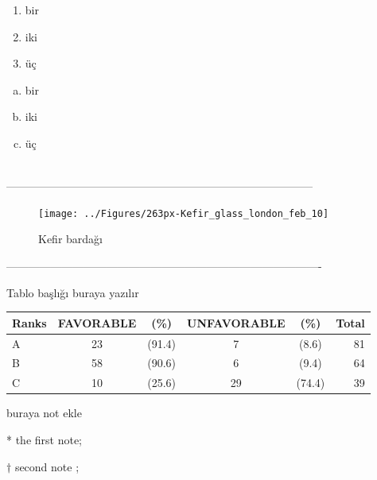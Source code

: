 \begin{minipage}{0.45\textwidth}
	\begin{enumerate}[1.]\itemsep-6pt%
		\item bir
		\item iki
		\item üç
	\end{enumerate}
\end{minipage}
\hfill
\begin{minipage}{0.45\textwidth}
	\begin{enumerate}[a.]\itemsep-6pt
		\item bir
		\item iki
		\item üç
	\end{enumerate}
\end{minipage}\\[3cm]
-----------------------------------------------------------------------------------
\newpage
\begin{figure}[tbph]
\centering
\texttt{[image: ../Figures/263px-Kefir\_glass\_london\_feb\_10]}
\caption[kfr]{Kefir bardağı}
\label{fig:263px-Kefir_glass_london_feb_10}
\end{figure}
-------------------------------------------------------------------------------------
\newpage
\begin{minipage}[c]{\textwidth}
	\renewcommand{\arraystretch}{1.3} %
	\centering
	\begin{threeparttable}
		\caption{Tablo başlığı buraya yazılır}  \label{tablo:1} %
		\begin{tabular}{lccccr}
			\hline\hline
			Ranks & FAVORABLE \tnote{*} &(\%) & UNFAVORABLE &(\%) & Total \\
			 \hline
			A& 23 & (91.4) & 7 & (8.6) & 81 \\ 
			B& 58 & (90.6) & 6 & (9.4) & 64 \\ 
			C& 10 & (25.6) & 29 & (74.4) & 39 \\
			\hline
		\end{tabular}
		\begin{tablenotes}
			\footnotesize
			\item[] buraya not ekle\\
			\item[*] the first note; %
			\item[$\dag$] second note ; %
		\end{tablenotes}
	\end{threeparttable}
\end{minipage}


